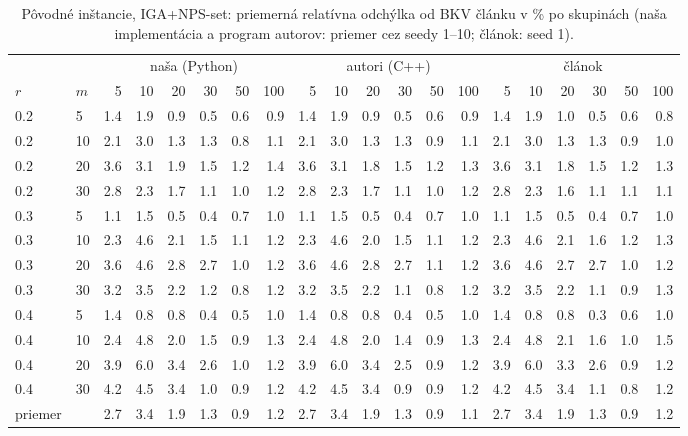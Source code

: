\begin{table}[ht]
\centering
\scriptsize
\setlength{\tabcolsep}{3pt}
\caption{Pôvodné inštancie, IGA+NPS-set: priemerná relatívna odchýlka od BKV článku v \% po skupinách (naša implementácia a program autorov: priemer cez seedy 1--10; článok: seed 1).}
\label{tab:orig_rpd_nps}
\begin{tabular}{ll|rrrrrr|rrrrrr|rrrrrr}
\toprule
 &  & \multicolumn{6}{c}{naša (Python)} & \multicolumn{6}{c}{autori (C++)} & \multicolumn{6}{c}{článok} \\
$r$ & $m$ & 5 & 10 & 20 & 30 & 50 & 100 & 5 & 10 & 20 & 30 & 50 & 100 & 5 & 10 & 20 & 30 & 50 & 100 \\
\midrule
0.2 & 5 & 1.4 & 1.9 & 0.9 & 0.5 & 0.6 & 0.9 & 1.4 & 1.9 & 0.9 & 0.5 & 0.6 & 0.9 & 1.4 & 1.9 & 1.0 & 0.5 & 0.6 & 0.8 \\
0.2 & 10 & 2.1 & 3.0 & 1.3 & 1.3 & 0.8 & 1.1 & 2.1 & 3.0 & 1.3 & 1.3 & 0.9 & 1.1 & 2.1 & 3.0 & 1.3 & 1.3 & 0.9 & 1.0 \\
0.2 & 20 & 3.6 & 3.1 & 1.9 & 1.5 & 1.2 & 1.4 & 3.6 & 3.1 & 1.8 & 1.5 & 1.2 & 1.3 & 3.6 & 3.1 & 1.8 & 1.5 & 1.2 & 1.3 \\
0.2 & 30 & 2.8 & 2.3 & 1.7 & 1.1 & 1.0 & 1.2 & 2.8 & 2.3 & 1.7 & 1.1 & 1.0 & 1.2 & 2.8 & 2.3 & 1.6 & 1.1 & 1.1 & 1.1 \\
0.3 & 5 & 1.1 & 1.5 & 0.5 & 0.4 & 0.7 & 1.0 & 1.1 & 1.5 & 0.5 & 0.4 & 0.7 & 1.0 & 1.1 & 1.5 & 0.5 & 0.4 & 0.7 & 1.0 \\
0.3 & 10 & 2.3 & 4.6 & 2.1 & 1.5 & 1.1 & 1.2 & 2.3 & 4.6 & 2.0 & 1.5 & 1.1 & 1.2 & 2.3 & 4.6 & 2.1 & 1.6 & 1.2 & 1.3 \\
0.3 & 20 & 3.6 & 4.6 & 2.8 & 2.7 & 1.0 & 1.2 & 3.6 & 4.6 & 2.8 & 2.7 & 1.1 & 1.2 & 3.6 & 4.6 & 2.7 & 2.7 & 1.0 & 1.2 \\
0.3 & 30 & 3.2 & 3.5 & 2.2 & 1.2 & 0.8 & 1.2 & 3.2 & 3.5 & 2.2 & 1.1 & 0.8 & 1.2 & 3.2 & 3.5 & 2.2 & 1.1 & 0.9 & 1.3 \\
0.4 & 5 & 1.4 & 0.8 & 0.8 & 0.4 & 0.5 & 1.0 & 1.4 & 0.8 & 0.8 & 0.4 & 0.5 & 1.0 & 1.4 & 0.8 & 0.8 & 0.3 & 0.6 & 1.0 \\
0.4 & 10 & 2.4 & 4.8 & 2.0 & 1.5 & 0.9 & 1.3 & 2.4 & 4.8 & 2.0 & 1.4 & 0.9 & 1.3 & 2.4 & 4.8 & 2.1 & 1.6 & 1.0 & 1.5 \\
0.4 & 20 & 3.9 & 6.0 & 3.4 & 2.6 & 1.0 & 1.2 & 3.9 & 6.0 & 3.4 & 2.5 & 0.9 & 1.2 & 3.9 & 6.0 & 3.3 & 2.6 & 0.9 & 1.2 \\
0.4 & 30 & 4.2 & 4.5 & 3.4 & 1.0 & 0.9 & 1.2 & 4.2 & 4.5 & 3.4 & 0.9 & 0.9 & 1.2 & 4.2 & 4.5 & 3.4 & 1.1 & 0.8 & 1.2 \\
\midrule
priemer &  & 2.7 & 3.4 & 1.9 & 1.3 & 0.9 & 1.2 & 2.7 & 3.4 & 1.9 & 1.3 & 0.9 & 1.1 & 2.7 & 3.4 & 1.9 & 1.3 & 0.9 & 1.2 \\
\bottomrule
\end{tabular}
\end{table}
